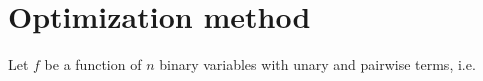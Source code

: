 %	




\section{Optimization method}

Let $f$ be a function of $n$ binary variables with unary and pairwise terms, i.e.


